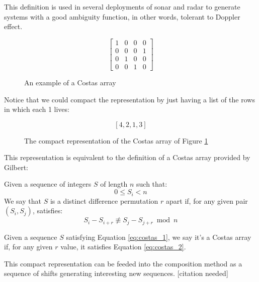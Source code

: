 This definition is used in several deployments of sonar and radar to generate
systems with a good ambiguity function, in other words, tolerant to Doppler
effect.

\begin{figure}[ht!]
  $$
  \begin{bmatrix}
   1&0&0&0\\
   0&0&0&1\\
   0&1&0&0\\
   0&0&1&0
  \end{bmatrix}
  $$
  \caption{An example of a Costas array}
  \label{fig:costas_1}
\end{figure}

Notice that we could compact the representation by just having a list of the
rows in which each 1 lives:

\begin{figure}[ht!]
  $$[4, 2, 1, 3]$$
  \caption{The compact representation of the Costas array of Figure
  \ref{fig:costas_1}}
  \label{fig:costas_2}
\end{figure}

This representation is equivalent to the definition of a Costas array provided
by Gilbert:

\begin{definition}\label{def:costas_1}
  Given a sequence of integers $S$ of length $n$ such that:
    \begin{equation}\label{eq:costas_1}
      0 \leq S_{i} < n
    \end{equation}
  We say that $S$ is a distinct difference permutation $r$ apart if,
  for any given pair $(S_{i}, S_{j})$, satisfies:
    \begin{equation}\label{eq:costas_2}
      S_{i} - S_{i+r} \not \equiv S_{j} - S_{j+r} \bmod n
    \end{equation}
\end{definition}

\begin{definition}
  Given a sequence $S$ satisfying Equation \ref{eq:costas_1}, we say it's a
  Costas array if, for any given $r$ value, it satisfies Equation
  \ref{eq:costas_2}.
\end{definition}

This compact representation can be feeded into the composition method as
a sequence of shifts generating interesting new sequences. [citation needed]\\

